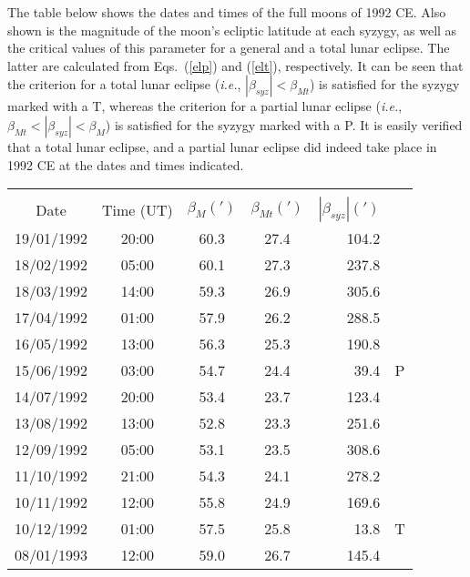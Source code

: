 The table below shows the dates and times of the full moons
of 1992 CE. Also shown is the magnitude of the moon's ecliptic latitude
at each syzygy, as well as the critical values of
this parameter for a general and a total lunar eclipse. The latter are calculated from
Eqs.~(\ref{elp}) and (\ref{elt}), respectively. It can be seen that
the criterion for a total lunar eclipse ({\em i.e.}, $|\beta_{syz}|< \beta_{Mt}$) is satisfied for the syzygy  marked with a T, whereas
the criterion for a partial lunar eclipse  ({\em i.e.}, $\beta_{Mt}<|\beta_{syz}|< \beta_{M}$) is satisfied for the syzygy marked with a P. It is easily verified
that a total lunar eclipse, and a partial lunar eclipse did indeed
take place in 1992 CE at the dates and times indicated.\\
\begin{tabular}{ccccrc}
&&&&&\\
Date & Time (UT) & $\beta_{M}(')$ & $\beta_{Mt}(')$ & $|\beta_{syz}|(')$\\\hline
19/01/1992  &20:00   &60.3   &27.4  &104.2   &\\
18/02/1992  &05:00   &60.1   &27.3  &237.8   &\\
18/03/1992  &14:00   &59.3   &26.9  &305.6   &\\
17/04/1992  &01:00   &57.9   &26.2  &288.5   &\\
16/05/1992  &13:00   &56.3   &25.3  &190.8   &\\
15/06/1992  &03:00   &54.7   &24.4  & 39.4  &P\\
14/07/1992  &20:00   &53.4   &23.7  &123.4  & \\
13/08/1992  &13:00   &52.8   &23.3  &251.6  & \\
12/09/1992  &05:00   &53.1   &23.5  &308.6  & \\
11/10/1992  &21:00   &54.3   &24.1  &278.2  & \\
10/11/1992  &12:00   &55.8   &24.9  &169.6  & \\
10/12/1992  &01:00   &57.5   &25.8   &13.8  &T\\
08/01/1993  &12:00   &59.0   &26.7  &145.4  & \\
\end{tabular}


